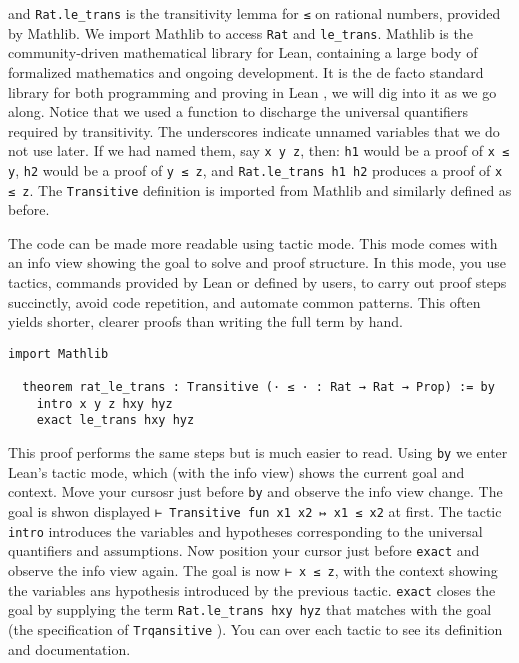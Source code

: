 and \lstinline[language=lean]|Rat.le_trans| is the transitivity lemma 
for \lstinline[language=lean]|≤| on rational numbers, provided by Mathlib.
We import Mathlib to access \lstinline[language=lean]|Rat| 
and \lstinline[language=lean]|le_trans|. 
Mathlib is the community‑driven mathematical 
library for Lean, containing a large body of formalized mathematics 
and ongoing development.
It is the de
facto standard library for both programming and proving
in Lean \cite{mathlib2020}, we will dig into it as we go along.
Notice that we used a function to discharge the universal 
quantifiers required by transitivity. The underscores indicate 
unnamed variables that we do not use later. If we had named 
them, say \lstinline|x y z|, then:
\lstinline[language=lean]|h1| would be a proof of \lstinline[language=lean]|x ≤ y|,
\lstinline[language=lean]|h2| would be a proof of \lstinline[language=lean]|y ≤ z|,
and \lstinline[language=lean]|Rat.le_trans h1 h2| produces a proof of \lstinline[language=lean]|x ≤ z|.
The \lstinline[language=lean]|Transitive| definition is imported from Mathlib and similarly defined as before. 
\begin{example}
  The code can be made more readable using tactic mode. 
  This mode comes with an info view showing the goal to solve and proof structure.
  In this mode, you use tactics, commands provided by Lean or defined by users,
  to carry out proof steps succinctly, avoid code repetition, 
  and automate common patterns. 
  This often yields shorter, clearer proofs than writing the full term by hand.
  \begin{lstlisting}[language=lean]
  import Mathlib

  theorem rat_le_trans : Transitive (· ≤ · : Rat → Rat → Prop) := by
    intro x y z hxy hyz
    exact le_trans hxy hyz
  \end{lstlisting}
  This proof performs the same steps but is much easier to read. 
  Using \lstinline[language=lean]|by| we enter Lean’s tactic mode, 
  which (with the info view) 
  shows the current goal and context. 
  Move your cursosr just before \lstinline[language=lean]|by|
  and observe the info view change. 
  The goal is shwon displayed \lstinline[language=lean]|⊢ Transitive fun x1 x2 ↦ x1 ≤ x2| at first.
  The tactic \lstinline[language=lean]|intro| introduces 
  the variables and hypotheses corresponding to the universal quantifiers 
  and assumptions.
  Now position your cursor just before \lstinline[language=lean]|exact|
  and observe the info view again. 
  The goal is now \lstinline[language=lean]|⊢ x ≤ z|, with the context 
  showing the variables ans hypothesis introduced by the previous tactic.
  \lstinline[language=lean]|exact| closes the goal 
  by supplying the term \lstinline[language=lean]|Rat.le_trans hxy hyz| that matches with the goal
  (the specification of \lstinline[language=lean]|Trqansitive|  ).
  You can over each tactic to see its definition and documentation.
\end{example}
